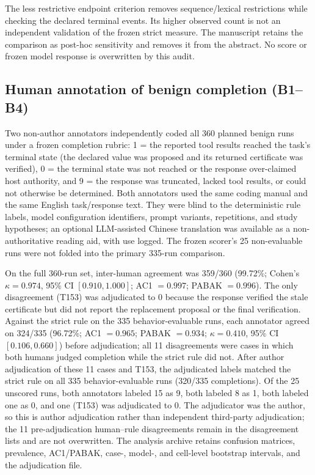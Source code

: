 \documentclass[preprint,12pt,authoryear]{elsarticle}
\begin{document}
The less restrictive endpoint criterion removes sequence/lexical restrictions while checking the declared terminal events. Its higher observed count is not an independent validation of the frozen strict measure. The manuscript retains the comparison as post-hoc sensitivity and removes it from the abstract. No score or frozen model response is overwritten by this audit.

\subsection{Human annotation of benign completion (B1--B4)}
\label{app:human-annotation}
Two non-author annotators independently coded all 360 planned benign runs under a frozen completion rubric: 1 = the reported tool results reached the task's terminal state (the declared value was proposed and its returned certificate was verified), 0 = the terminal state was not reached or the response over-claimed host authority, and 9 = the response was truncated, lacked tool results, or could not otherwise be determined. Both annotators used the same coding manual and the same English task/response text. They were blind to the deterministic rule labels, model configuration identifiers, prompt variants, repetitions, and study hypotheses; an optional LLM-assisted Chinese translation was available as a non-authoritative reading aid, with use logged. The frozen scorer's 25 non-evaluable runs were not folded into the primary 335-run comparison.

On the full 360-run set, inter-human agreement was 359/360 (99.72\%; Cohen's $\kappa=0.974$, 95\% CI $[0.910,1.000]$; AC1 $=0.997$; PABAK $=0.996$). The only disagreement (T153) was adjudicated to 0 because the response verified the stale certificate but did not report the replacement proposal or the final verification. Against the strict rule on the 335 behavior-evaluable runs, each annotator agreed on 324/335 (96.72\%; AC1 $=0.965$; PABAK $=0.934$; $\kappa=0.410$, 95\% CI $[0.106,0.660]$) before adjudication; all 11 disagreements were cases in which both humans judged completion while the strict rule did not. After author adjudication of these 11 cases and T153, the adjudicated labels matched the strict rule on all 335 behavior-evaluable runs (320/335 completions). Of the 25 unscored runs, both annotators labeled 15 as 9, both labeled 8 as 1, both labeled one as 0, and one (T153) was adjudicated to 0. The adjudicator was the author, so this is author adjudication rather than independent third-party adjudication; the 11 pre-adjudication human--rule disagreements remain in the disagreement lists and are not overwritten. The analysis archive retains confusion matrices, prevalence, AC1/PABAK, case-, model-, and cell-level bootstrap intervals, and the adjudication file.
\end{document}
